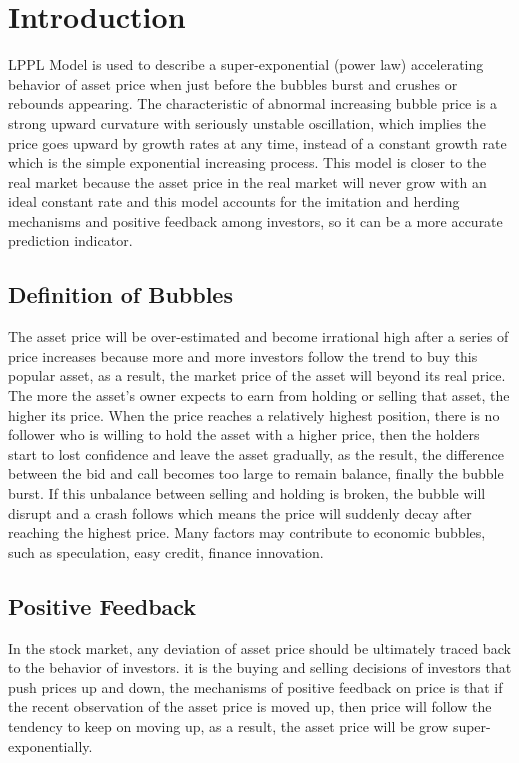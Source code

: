 \section{Introduction}
LPPL Model is used to describe a super-exponential (power law) accelerating behavior of asset price when just before the bubbles burst and crushes or rebounds appearing. The characteristic of abnormal increasing bubble price is a strong upward curvature with seriously unstable oscillation, which implies the price goes upward by growth rates at any time, instead of a constant growth rate which is the simple exponential increasing process\cite{R:1}. This model is closer to the real market because the asset price in the real market will never grow with an ideal constant rate and this model accounts for the imitation and herding mechanisms and positive feedback among investors, so it can be a more accurate prediction indicator\cite{R:2}.
\subsection{Definition of Bubbles}
The asset price will be over-estimated and become irrational high after a series of price increases because more and more investors follow the trend to buy this popular asset, as a result, the market price of the asset will beyond its real price. The more the asset's owner expects to earn from holding or selling that asset, the higher its price. When the price reaches a relatively highest position, there is no follower who is willing to hold the asset with a higher price, then the holders start to lost confidence and leave the asset gradually, as the result, the difference between the bid and call becomes too large to remain balance, finally the bubble burst. If this unbalance between selling and holding is broken, the bubble will disrupt and a crash follows which means the price will suddenly decay after reaching the highest price. Many factors may contribute to economic bubbles, such as speculation, easy credit, finance innovation.


\subsection{Positive Feedback}
In the stock market, any deviation of asset price should be ultimately traced back to the behavior of investors. it is the buying and selling decisions of investors that push prices up and down, the mechanisms of positive feedback on price is that if the recent observation of the asset price is moved up, then price will follow the tendency to keep on moving up, as a result, the asset price will be grow super-exponentially.

